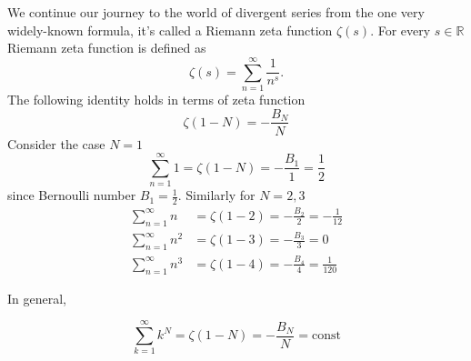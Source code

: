 We continue our journey to the world of divergent series from the one very widely-known formula, it's called a Riemann
zeta function $\zeta(s)$.
For every $s \in \mathbb{R}$ Riemann zeta function is defined as
\begin{equation*}
    \zeta(s) = \sum_{n=1}^{\infty} \frac{1}{n^s}.
\end{equation*}
The following identity holds in terms of zeta function
\begin{equation*}
    \zeta(1 - N) = -\frac{B_N}{N}
\end{equation*}
Consider the case $N=1$
\begin{equation*}
    \sum_{n=1}^{\infty} 1 = \zeta(1 - N)  = - \frac{B_1}{1} = \frac{1}{2}
\end{equation*}
since Bernoulli number $B_1 = \frac{1}{2}$.
Similarly for $N = 2,3$
\begin{align*}
    \sum_{n=1}^{\infty} n &= \zeta(1 - 2) = -\frac{B_2}{2} = -\frac{1}{12} \\
    \sum_{n=1}^{\infty} n^2 &= \zeta(1 - 3) = -\frac{B_3}{3} = 0 \\
    \sum_{n=1}^{\infty} n^3 &= \zeta(1 - 4) = -\frac{B_4}{4} = \frac{1}{120}
\end{align*}

In general,

\begin{equation*}
    \sum_{k=1}^{\infty} k^N = \zeta(1 - N) = -\frac{B_N}{N} = \mathrm{const}
\end{equation*}